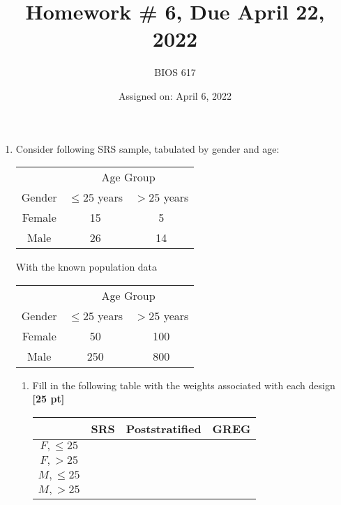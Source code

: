 \documentclass[12pt]{article}
\begin{document}
\title{Homework \# 6, Due April 22, 2022}
\author{BIOS 617}
\date{Assigned on: April 6, 2022}

\maketitle

\begin{enumerate}
\setlength{\itemsep}{15pt}%
\setlength{\parskip}{15pt}%

\item Consider following SRS sample, tabulated by gender and age:
\begin{table}[!th]
\centering
\begin{tabular}{c c c}
& \multicolumn{2}{c}{Age Group} \\ \cline{2-3}
Gender & $\leq 25$ years & $> 25$ years \\ \hline
Female & 15 & 5 \\
Male & 26 & 14 \\ \hline
\end{tabular}
\end{table}

With the known population data

\begin{table}[!th]
\centering
\begin{tabular}{c c c}
& \multicolumn{2}{c}{Age Group} \\ \cline{2-3}
Gender & $\leq 25$ years & $> 25$ years \\ \hline
Female & 50 & 100 \\
Male & 250 & 800 \\ \hline
\end{tabular}
\end{table}

\begin{enumerate}[itemsep=5ex]
	\item  Fill in the following table with the weights associated with each design {\bf [25 pt]}

	\begin{table}[!th]
	\centering
	\begin{tabular}{c | p{1in} | p{1in} | p{1in} |}
	 & SRS & Poststratified & GREG \\ \hline
	$F, \leq 25$ & & & \\
	$F, > 25$ & & & \\
	$M, \leq 25$ & & & \\
	$M, > 25$ & & & \\ \hline
	\end{tabular}
	\end{table}


\end{enumerate}
\end{enumerate}
\end{document}
